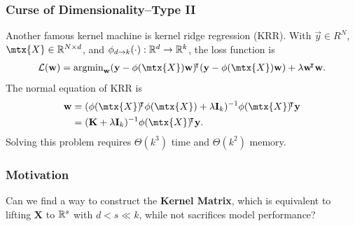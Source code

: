 \documentclass[10pt]{../formats/RU}
\begin{document}
\begin{frame}
  \frametitle{Curse of Dimensionality--Type II}
  Another famous kernel machine is kernel ridge regression (KRR). With $\vec{y}\in R^N$, $\mtx{X}\in\R^{N\times d}$, and $\phi_{d\rightarrow k}(\cdot):\mathbb{R}^d\rightarrow\mathbb{R}^k$, the loss function is
      \begin{align*}
        \mathcal{L}(\vec{w})=\argmin_{\vec{w}}(\vec{y}-\phi(\mtx{X})\vec{w})\trn(\vec{y}-\phi(\mtx{X})\vec{w}) + \lambda\vec{w}\trn\vec{w}.
      \end{align*}
    The normal equation of KRR is
    \begin{align*}
      \vec{w} &= (\phi(\mtx{X})\trn\phi(\mtx{X})+\lambda\mathbf{I}_k)^{-1}\phi(\mtx{X})\trn\vec{y} \\
      &= (\mathbf{K}+\lambda\mathbf{I}_k)^{-1}\phi(\mtx{X})\trn\vec{y}.
    \end{align*}
    Solving this problem requires $\Theta(k^3)$ time and $\Theta(k^2)$ memory.
\end{frame}
\begin{frame}
  \frametitle{Motivation}
  Can we find a way to construct the \textbf{Kernel Matrix}, which is equivalent to lifting $\mathbf{X}$ to $\mathbb{R}^s$ with $d < s\ll k$, while not sacrifices model performance?
\end{frame}
\end{document}
